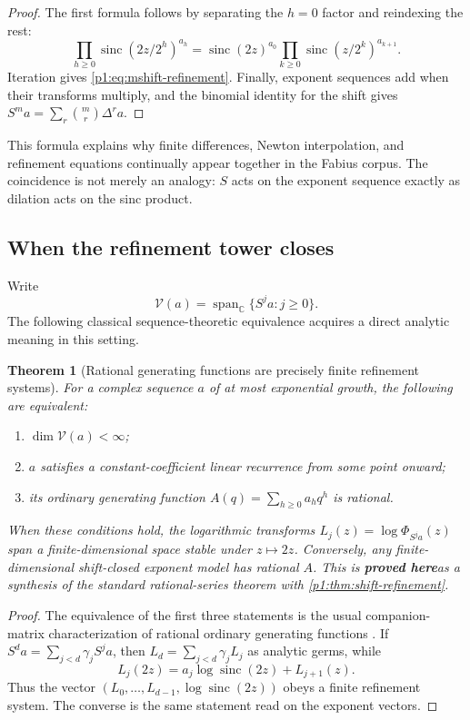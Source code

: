 \documentclass[11pt,oneside]{article}
\numberwithin{equation}{section}
\newtheorem{theorem}{Theorem}[section]
\theoremstyle{definition}
\theoremstyle{remark}
\newcommand{\C}{\mathbb C}
\newcommand{\sinc}{\operatorname{sinc}}
\newcommand{\statusproved}{\textcolor{deepgreen}{\textbf{proved here}}}
\begin{document}
\begin{proof}
The first formula follows by separating the $h=0$ factor and reindexing the rest:
\[
 \prod_{h\ge0}\sinc(2z/2^h)^{a_h}
 =\sinc(2z)^{a_0}
  \prod_{k\ge0}\sinc(z/2^k)^{a_{k+1}}.
\]
Iteration gives \eqref{p1:eq:mshift-refinement}.  Finally, exponent sequences add when their
transforms multiply, and the binomial identity for the shift gives
$S^ma=\sum_r\binom mr\Delta^ra$.
\end{proof}

\begin{remark}
This formula explains why finite differences, Newton interpolation, and refinement equations
continually appear together in the Fabius corpus.  The coincidence is not merely an analogy:
$S$ acts on the exponent sequence exactly as dilation acts on the sinc product.
\end{remark}

\subsection{When the refinement tower closes}

Write
\[
 \mathscr V(a)=\operatorname{span}_{\C}\{S^ja:j\ge0\}.
\]
The following classical sequence-theoretic equivalence acquires a direct analytic meaning in
this setting.

\begin{theorem}[Rational generating functions are precisely finite refinement systems]
\label{p1:thm:rational-classification}
For a complex sequence $a$ of at most exponential growth, the following are equivalent:
\begin{enumerate}
\item $\dim\mathscr V(a)<\infty$;
\item $a$ satisfies a constant-coefficient linear recurrence from some point onward;
\item its ordinary generating function $A(q)=\sum_{h\ge0}a_hq^h$ is rational.
\end{enumerate}
When these conditions hold, the logarithmic transforms
$L_j(z)=\log\Phi_{S^ja}(z)$ span a finite-dimensional space stable under $z\mapsto2z$.
Conversely, any finite-dimensional shift-closed exponent model has rational $A$.
This is \statusproved as a synthesis of the standard rational-series theorem with
\cref{p1:thm:shift-refinement}.
\end{theorem}

\begin{proof}
The equivalence of the first three statements is the usual companion-matrix characterization
of rational ordinary generating functions \cite{p1:stanley1997}.  If
$S^da=\sum_{j<d}\gamma_jS^ja$, then
$L_d=\sum_{j<d}\gamma_jL_j$ as analytic germs, while
\[
 L_j(2z)=a_j\log\sinc(2z)+L_{j+1}(z).
\]
Thus the vector $(L_0,\ldots,L_{d-1},\log\sinc(2z))$ obeys a finite refinement system.
The converse is the same statement read on the exponent vectors.
\end{proof}
\end{document}
